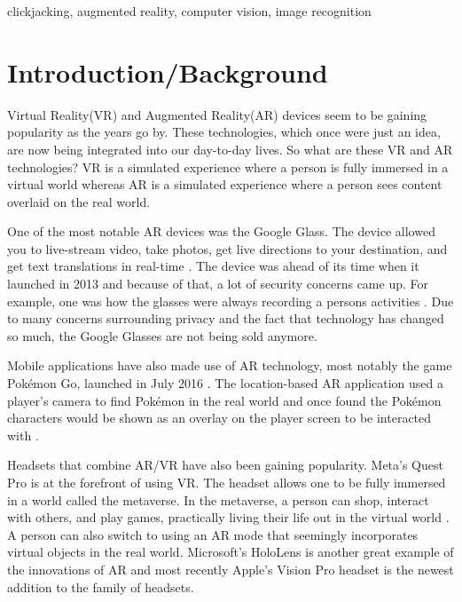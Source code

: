 \documentclass[conference]{IEEEtran}
\begin{document}
\begin{IEEEkeywords}
clickjacking, augmented reality, computer vision, image recognition
\end{IEEEkeywords}

\section{Introduction/Background}

Virtual Reality(VR) and Augmented Reality(AR) devices seem to be gaining popularity as the years go by. These technologies, which once were just an idea, are now being integrated into our day-to-day lives. So what are these VR and AR technologies? VR is a simulated experience where a person is fully immersed in a virtual world whereas AR is a simulated experience where a person sees content overlaid on the real world. 

One of the most notable AR devices was the Google Glass. The device allowed you to live-stream video, take photos, get live directions to your destination, and  get text translations in real-time \cite{colin_steele_what_nodate}. The device was ahead of its time when it launched in 2013 and because of that, a lot of security concerns came up. For example, one was how the glasses were always recording a persons activities \cite{colin_steele_what_nodate}. Due to many concerns surrounding privacy and the fact that technology has changed so much, the Google Glasses are not being sold anymore. 

Mobile applications have also made use of AR technology, most notably the game Pokémon Go, launched in July 2016 \cite{paavilainen_pokemon_2017}. The location-based AR application used a player's camera to find Pokémon in the real world and once found the Pokémon characters would be shown as an overlay on the player screen to be interacted with \cite{paavilainen_pokemon_2017}. 

Headsets that combine AR/VR have also been gaining popularity. Meta's Quest Pro is at the forefront of using VR. The headset allows one to be fully immersed in a world called the metaverse. In the metaverse, a person can shop, interact with others, and play games, practically living their life out in the virtual world \cite{wang_survey_2023}. A person can also switch to using an AR mode that seemingly incorporates virtual objects in the real world. Microsoft's HoloLens is another great example of the innovations of AR and most recently Apple's Vision Pro headset is the newest addition to the family of headsets. 
\end{document}
